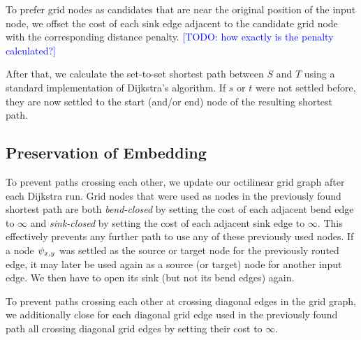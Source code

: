 \documentclass[sigconf]{acmart}
\newcommand\TODO[1]{\textcolor{blue}{\small [TODO: #1]}}
\begin{document}
To prefer grid nodes as candidates that are near the original position of the input node, we offset the cost of each sink edge adjacent to the candidate grid node with the corresponding distance penalty. \TODO{how exactly is the penalty calculated?}

After that, we calculate the set-to-set shortest path between $S$ and $T$ using a standard implementation of Dijkstra's algorithm.
If $s$ or $t$ were not settled before, they are now settled to the start (and/or end) node of the resulting shortest path.

\subsection{Preservation of Embedding}

To prevent paths crossing each other, we update our octilinear grid graph after each Dijkstra run.
Grid nodes that were used as nodes in the previously found shortest path are both \emph{bend-closed} by setting the cost of each adjacent bend edge to $\infty$ and \emph{sink-closed} by setting the cost of each adjacent sink edge to $\infty$.
This effectively prevents any further path to use any of these previously used nodes.
If a node $\psi_{x, y}$ was settled as the source or target node for the previously routed edge, it may later be used again as a source (or target) node for another input edge.
We then have to open its sink (but not its bend edges) again.

To prevent paths crossing each other at crossing diagonal edges in the grid graph, we additionally close for each diagonal grid edge used in the previously found path all crossing diagonal grid edges by setting their cost to $\infty$.
\end{document}
